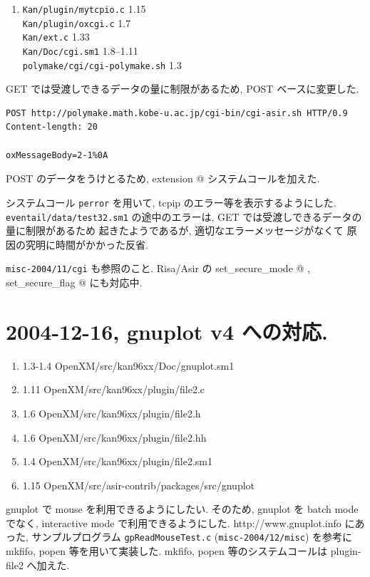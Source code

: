 \documentclass{jarticle}
\begin{document}
\begin{enumerate}
\item 
{\tt Kan/plugin/mytcpio.c} 1.15 \\
{\tt Kan/plugin/oxcgi.c} 1.7 \\
{\tt Kan/ext.c} 1.33 \\
{\tt Kan/Doc/cgi.sm1} 1.8--1.11 \\
{\tt polymake/cgi/cgi-polymake.sh} 1.3 
\end{enumerate}

GET では受渡しできるデータの量に制限があるため,
POST ベースに変更した.
\begin{verbatim}
POST http://polymake.math.kobe-u.ac.jp/cgi-bin/cgi-asir.sh HTTP/0.9
Content-length: 20

oxMessageBody=2-1%0A
\end{verbatim}

POST のデータをうけとるため,
 extension @
システムコールを加えた.

システムコール {\tt perror} を用いて,
tcpip のエラー等を表示するようにした.
{\tt eventail/data/test32.sm1} の途中のエラーは,
GET では受渡しできるデータの量に制限があるため
起きたようであるが, 適切なエラーメッセージがなくて
原因の究明に時間がかかった反省.

{\tt misc-2004/11/cgi} も参照のこと.
Risa/Asir の \verb@ set_secure_mode @ , \verb@ set_secure_flag @
にも対応中.

\section{2004-12-16, gnuplot v4 への対応.}

\begin{enumerate}
\item 1.3-1.4     OpenXM/src/kan96xx/Doc/gnuplot.sm1 
\item 1.11        OpenXM/src/kan96xx/plugin/file2.c 
\item 1.6           OpenXM/src/kan96xx/plugin/file2.h
\item 1.6        OpenXM/src/kan96xx/plugin/file2.hh
\item 1.4          OpenXM/src/kan96xx/plugin/file2.sm1
\item 1.15        OpenXM/src/asir-contrib/packages/src/gnuplot
\end{enumerate}

gnuplot で mouse  を利用できるようにしたい.
そのため, gnuplot を batch mode でなく,
interactive mode で利用できるようにした.
http://www.gnuplot.info にあった, サンプルプログラム
{\tt gpReadMouseTest.c} ({\tt misc-2004/12/misc}) 
を参考に mkfifo, popen 等を用いて実装した.
mkfifo, popen 等のシステムコールは plugin-file2 へ加えた.
\end{document}
